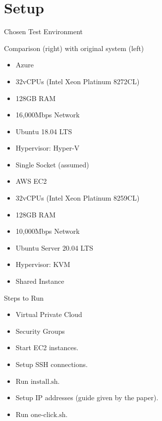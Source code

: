\documentclass[xcolor=dvipsnames]{beamer}
\begin{document}
    

    \section{Setup}

    
    \begin{frame}{Chosen Test Environment}

        Comparison (right) with original system (left)
        \begin{multicols}{2}
            \begin{itemize}
                \item Azure
                \item 32vCPUs (Intel Xeon Platinum 8272CL) 
                \item 128GB RAM 
                \item 16,000Mbps Network
                \item Ubuntu 18.04 LTS
                \item Hypervisor: Hyper-V
                \item Single Socket (assumed)
                \item AWS EC2
                \item 32vCPUs (Intel Xeon Platinum 8259CL) 
                \item 128GB RAM
                \item 10,000Mbps Network 
                \item Ubuntu Server 20.04 LTS
                \item Hypervisor: KVM
                \item Shared Instance
            \end{itemize}      
        \end{multicols}
    \end{frame}


    \begin{frame}{Steps to Run}

        \begin{itemize}
            \item Virtual Private Cloud 
            \item Security Groups 
            \item Start EC2 instances.
            \item Setup SSH connections. 
            \item Run $\text{install}.\text{sh}$.
            \item Setup IP addresses (guide given by the paper).
            \item Run $\text{one-click}.\text{sh}$.
        \end{itemize}

    \end{frame}
\end{document}
